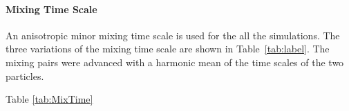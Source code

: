\paragraph{Mixing Time Scale} An anisotropic minor mixing time scale \cite{Vo2017a} is used for the all the simulations. The three variations of the mixing time scale are shown in Table~\vref{tab:label}. The mixing pairs were advanced with a harmonic mean of the time scales of the two particles.

Table \ref{tab:MixTime}
